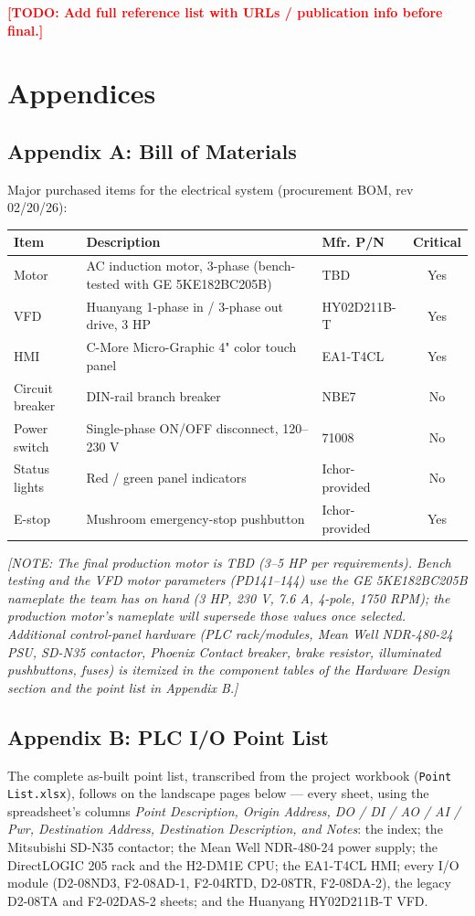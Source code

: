 \documentclass[hidelinks,12pt]{article}
\newcommand{\todo}[1]{\textcolor{red}{\textbf{[TODO: #1]}}}
\newcommand{\note}[1]{\textcolor{PSUblue}{\textit{[NOTE: #1]}}}
\begin{document}
\todo{Add full reference list with URLs / publication info before final.}

\section{Appendices}

\subsection{Appendix A: Bill of Materials}
Major purchased items for the electrical system (procurement BOM, rev 02/20/26):

\renewcommand{\arraystretch}{1.25}
\noindent\begin{tabularx}{\textwidth}{|l|X|l|c|}
\hline
\textbf{Item} & \textbf{Description} & \textbf{Mfr. P/N} & \textbf{Critical} \\
\hline
Motor & AC induction motor, 3-phase (bench-tested with GE 5KE182BC205B) & TBD & Yes \\ \hline
VFD & Huanyang 1-phase in / 3-phase out drive, 3 HP & HY02D211B-T & Yes \\ \hline
HMI & C-More Micro-Graphic 4" color touch panel & EA1-T4CL & Yes \\ \hline
Circuit breaker & DIN-rail branch breaker & NBE7 & No \\ \hline
Power switch & Single-phase ON/OFF disconnect, 120--230 V & 71008 & No \\ \hline
Status lights & Red / green panel indicators & Ichor-provided & No \\ \hline
E-stop & Mushroom emergency-stop pushbutton & Ichor-provided & Yes \\
\hline
\end{tabularx}
\renewcommand{\arraystretch}{1.0}

\note{The final production motor is TBD (3--5 HP per requirements). Bench testing and
the VFD motor parameters (PD141--144) use the GE 5KE182BC205B nameplate the team has on
hand (3 HP, 230 V, 7.6 A, 4-pole, 1750 RPM); the production motor's nameplate will
supersede those values once selected. Additional control-panel hardware (PLC
rack/modules, Mean Well NDR-480-24 PSU, SD-N35 contactor, Phoenix Contact breaker,
brake resistor, illuminated pushbuttons, fuses) is itemized in the component tables of
the Hardware Design section and the point list in Appendix B.}

\subsection{Appendix B: PLC I/O Point List}
The complete as-built point list, transcribed from the project workbook
(\texttt{Point List.xlsx}), follows on the landscape pages below --- every sheet, using
the spreadsheet's columns \emph{Point Description, Origin Address, DO / DI / AO / AI /
Pwr, Destination Address, Destination Description, and Notes}: the index; the Mitsubishi
SD-N35 contactor; the Mean Well NDR-480-24 power supply; the DirectLOGIC 205 rack and
the H2-DM1E CPU; the EA1-T4CL HMI; every I/O module (D2-08ND3, F2-08AD-1, F2-04RTD,
D2-08TR, F2-08DA-2), the legacy D2-08TA and F2-02DAS-2 sheets; and the Huanyang
HY02D211B-T VFD.
\end{document}

